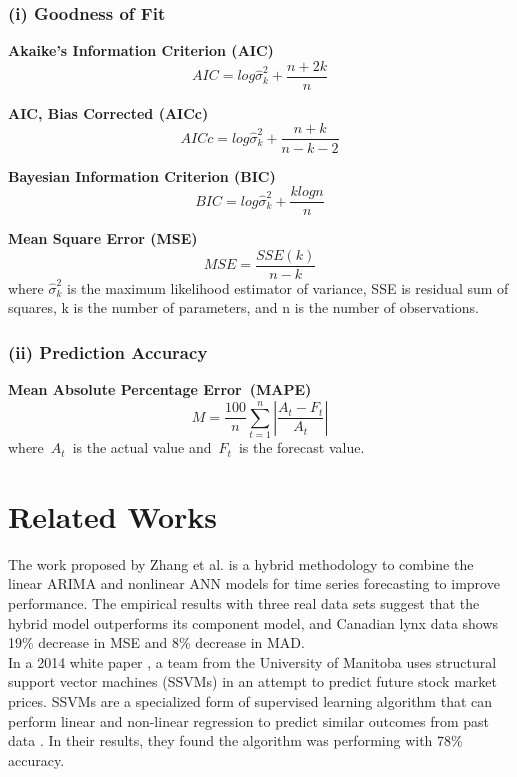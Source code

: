 \documentclass[11pt,a4paper]{article}
\begin{document}
\subsubsection*{(i) Goodness of Fit}

\hspace{3ex}
\textbf{Akaike’s Information Criterion (AIC)}
$$AIC = log\hat{\sigma}_k^2+\frac{n+2k}{n}$$

\textbf{AIC, Bias Corrected (AICc)}
$$AICc = log\hat{\sigma}_k^2+\frac{n+k}{n-k-2}$$

\textbf{Bayesian Information Criterion (BIC)}
$$BIC = log\hat{\sigma}_k^2+\frac{klog n}{n}$$

\textbf{Mean Square Error (MSE)}
$$MSE = \frac{SSE(k)}{n-k}$$
where $\hat{\sigma}_k^2$ is the maximum likelihood estimator of variance, SSE is residual sum of squares, k is the number of parameters, and n is the number of observations.

\subsubsection*{(ii) Prediction Accuracy}

\hspace{3ex}
\textbf{Mean Absolute Percentage Error (MAPE)}
$$M = \frac{100}{n}\sum_{t=1}^{n}|\frac{A_t-F_t}{A_t}|$$
where $A_t$ is the actual value and $F_t$ is the forecast value.


\section{Related Works}

\quad The work proposed by Zhang et al. \cite{zhang} is a hybrid methodology to combine the linear ARIMA and nonlinear ANN models for time series forecasting to improve performance. The empirical results with three real data sets suggest that the hybrid model outperforms its component model, and Canadian lynx data shows 19\% decrease in MSE and 8\% decrease in MAD.\\

\quad In a 2014 white paper \cite{carson}, a team from the University of Manitoba uses structural support vector machines (SSVMs) in an attempt to predict future stock market prices. SSVMs are a specialized form of supervised learning algorithm that can perform linear and non-linear regression to predict similar outcomes from past data \cite{tsochan}. In their results, they found the algorithm was performing with 78\% accuracy.\\
\end{document}
